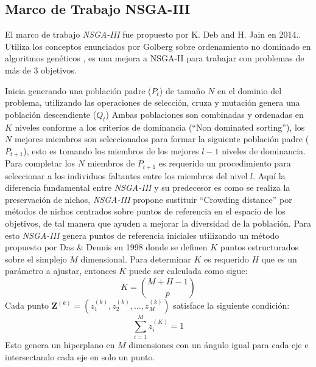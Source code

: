 \documentclass[letterpaper,10pt]{article}
\begin{document}
\subsection{Marco de Trabajo NSGA-III}

El marco de trabajo \emph{NSGA-III} fue propuesto por K. Deb and H. Jain en 2014.\cite{6600851}. Utiliza los conceptos enunciados por Golberg sobre ordenamiento no dominado en algoritmos genéticos \cite{goldberg1988genetic}
, es una mejora a NSGA-II para trabajar con problemas de más de $3$ objetivos.

Inicia generando una población padre ($P_t$) de tamaño $N$ en el dominio del problema, utilizando las operaciones de selección, cruza y mutación genera una población descendiente ($Q_t$)
Ambas poblaciones son combinadas y ordenadas en $K$ niveles conforme a los criterios de dominancia (``Non dominated sorting''), los $N$ mejores miembros son seleccionados para formar
la siguiente población padre ($P_{t+1}$), esto es tomando los miembros de los mejores $l-1$ niveles de dominancia. Para completar los $N$ miembros de $P_{t+1}$ es requerido un procedimiento
para seleccionar a los individuos faltantes entre los miembros del nivel $l$. Aquí la diferencia fundamental entre \emph{NSGA-III} y su predecesor es como se realiza la preservación de nichos,
\emph{NSGA-III} propone sustituir ``Crowding distance'' por métodos de nichos centrados sobre puntos de referencia en el espacio de los objetivos, de tal manera que ayuden a mejorar la diversidad de la población. Para esto \emph{NSGA-III} genera puntos de referencia
iniciales utilizando un método propuesto por Das \& Dennis en 1998 \cite{Das:1998:NIN:588907.589322} donde se definen $K$ puntos estructurados sobre el simplejo $M$ dimensional.
Para determinar $K$ es requerido $H$ que es un parámetro a ajustar, entonces $K$ puede ser calculada como sigue:
  $$K= {M+H-1 \choose p}$$
Cada punto $\bm{Z}^{(k)}=(z_1^{(k)},z_2^{(k)}, \dots, z_M^{(k)})$ satisface la siguiente condición:
  $$\sum_{i=1}^M z_i^{(K)} = 1$$
Esto genera un hiperplano en $M$ dimensiones con un ángulo igual para cada eje e intersectando cada eje en solo un punto.
\end{document}
